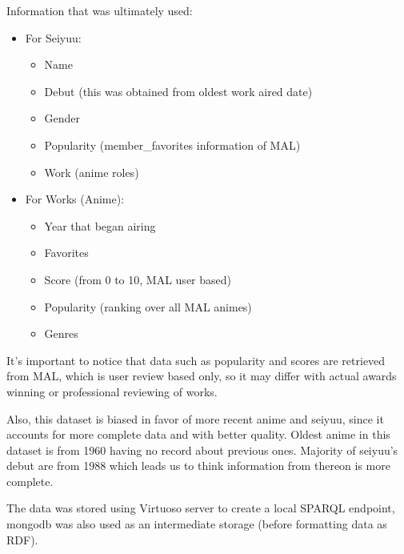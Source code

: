 Information that was ultimately used:
\begin{itemize}
	\item For Seiyuu:
	\begin{itemize}
		\item Name
		\item Debut (this was obtained from oldest work aired date)
		\item Gender
		\item Popularity (member\_favorites information of MAL)
		\item Work (anime roles)
	\end{itemize}
	\item For Works (Anime):
	\begin{itemize}
		\item Year that began airing
		\item Favorites
		\item Score (from 0 to 10, MAL user based)
		\item Popularity (ranking over all MAL animes)
		\item Genres
	\end{itemize}
\end{itemize}

It's important to notice that data such as popularity and scores are retrieved from MAL, which is user review based only, so it may differ with actual awards winning or professional reviewing of works.

Also, this dataset is biased in favor of more recent anime and seiyuu, since it accounts for more complete data and with better quality. Oldest anime in this dataset is from 1960 having no record about previous ones. Majority of seiyuu's debut are from 1988 which leads us to think information from thereon is more complete. 

The data was stored using Virtuoso server to create a local SPARQL endpoint, mongodb was also used as an intermediate storage (before formatting data as RDF).











